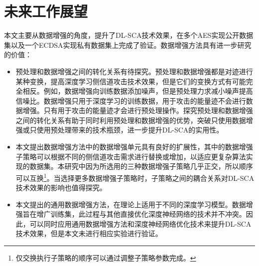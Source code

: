 {{	}
	\section{未来工作展望}
	本文主要从数据增强的角度，提升了DL-SCA技术效果，在多个AES实现公开数据集以及一个ECDSA实现私有数据集上完成了验证。数据增强方法具有进一步研究的价值：
	\begin{itemize}
		\item 预处理和数据增强之间的转化关系有待探究。预处理和数据增强都是对迹进行某种变换，提高深度学习侧信道攻击技术效果，但是它们的变换方式有可能完全相反。例如，数据增强向训练数据添加噪声，但是预处理力求减小噪声提高信噪比。数据增强只用于深度学习的训练数据，用于攻击的能量迹不会进行数据增强。只有用于攻击的能量迹才会进行预处理操作。探究预处理和数据增强之间的转化关系有助于同时利用预处理和数据增强的优势，突破只使用数据增强或只使用预处理带来的技术瓶颈，进一步提升DL-SCA的实用性。
		\item 本文提出数据增强方法中的数据增强单元具有良好的扩展性，其中的数据增强子策略可以根据不同的侧信道攻击需求进行替换或增加，以适应更复杂算法实现的数据集。本研究中因为所选用的三种数据增强子策略几乎正交，所以顺序可以互换\footnote{仅交换执行子策略的顺序可以通过调整子策略参数完成。}。当选择更多数据增强子策略时，子策略之间的耦合关系对DL-SCA技术效果的影响也值得探究。
		\item 本文提出的通用数据增强方法，在理论上适用于不同的深度学习模型。数据增强旨在增广训练集，此过程与其他直接优化深度神经网络的技术并不冲突。因此，可以同时应用通用数据增强方法和深度神经网络优化技术来提升DL-SCA技术效果，但是本文未进行相应实验进行验证。
	\end{itemize}
}